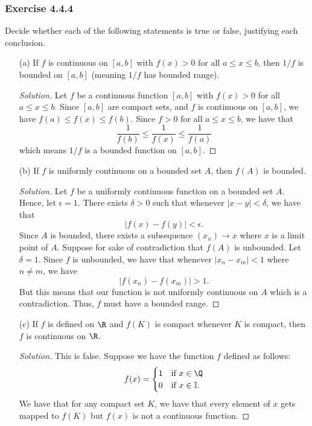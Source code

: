 \subsubsection{Exercise 4.4.4} Decide whether each of the following statements is true or false, justifying each conclusion.

\begin{enumerate}
    \item[(a)] If \( f \) is continuous on \( [a,b] \) with \( f(x) > 0  \) for all \( a \leq x \leq b  \), then \( 1 /  f \) is bounded on \( [a,b] \) (meaning \( 1/ f \) has bounded range).
        \begin{proof}[Solution]
            Let \( f  \) be a continuous function \( [a,b] \) with \( f(x) > 0  \) for all \( a \leq x \leq b  \). Since \( [a,b] \) are compact sets, and \( f  \) is continuous on \( [a,b]  \), we have \( f(a) \leq f(x) \leq f(b) \). Since \( f > 0  \) for all \( a \leq x \leq  b  \), we have that 
            \[  \frac{ 1 }{ f(b) } \leq \frac{ 1 }{ f(x) } \leq \frac{ 1 }{ f(a) }   \]
            which means \( 1 / f   \) is a bounded function on \( [a,b] \).
        \end{proof}
    \item[(b)] If \( f \) is uniformly continuous on a bounded set \( A  \), then \( f(A) \) is bounded.
        \begin{proof}[Solution]
        Let \( f  \) be a uniformly continuous function on a bounded set \( A  \). Hence, let \( \epsilon  = 1  \). There exists \( \delta > 0  \) such that whenever \( | x - y  | < \delta  \), we have that 
        \[  | f(x) -f(y) | < \epsilon. \]
Since \( A  \) is bounded, there exists a subsequence \( (x_n) \to x  \) where \( x  \) is a limit point of \( A  \). Suppose for sake of contradiction that \( f(A) \) is unbounded. Let \( \delta = 1  \). Since \( f  \) is unbounded, we have that whenever \( | x_n - x_m  | <  1 \) where \(  n \neq m  \), we have 
    \[ | f(x_n) - f(x_m) | > 1.\]
    But this means that our function is not uniformly continuous on \( A  \) which is a contradiction. Thus, \( f  \) must have a bounded range.

        \end{proof}
    \item[(c)] If \( f  \) is defined on \( \R  \) and \( f(K) \) is compact whenever \( K  \) is compact, then \( f  \) is continuous on \( \R  \).
        \begin{proof}[Solution]
        This is false. Suppose we have the function \( f  \) defined as follows:
        \begin{align*}
            f(x) &= 
            \begin{cases}
                1 &\text{if } x \in \Q \\ 
                0 &\text{if } x \in \mathbb{I}.
            \end{cases} \\
        \end{align*}
        We have that for any compact set \( K  \), we have that every element of \( x  \) gets mapped to \( f(K) \) but \( f(x) \) is not a continuous function.
        \end{proof}
\end{enumerate}


